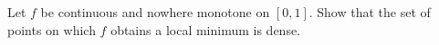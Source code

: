 Let $f$ be continuous and nowhere monotone on $[0,1]$. Show that the set of points on which $f$ obtains a local minimum is dense.